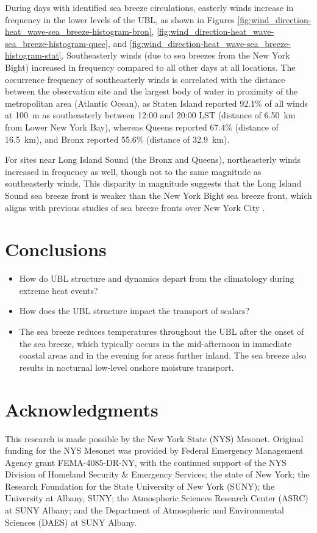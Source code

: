 \documentclass[11pt,a4paper]{article}
\begin{document}
During days with identified sea breeze circulations, easterly winds increase in frequency in the lower levels of the UBL, as shown in Figures \ref{fig:wind_direction-heat_wave-sea_breeze-histogram-bron}, \ref{fig:wind_direction-heat_wave-sea_breeze-histogram-quee}, and \ref{fig:wind_direction-heat_wave-sea_breeze-histogram-stat}. Southeasterly winds (due to sea breezes from the New York Bight) increased in frequency compared to all other days at all locations. The occurrence frequency of southeasterly winds is correlated with the distance between the observation site and the largest body of water in proximity of the metropolitan area (Atlantic Ocean), as Staten Island reported 92.1\% of all winds at \SI{100}{\meter} as southeasterly between 12:00 and 20:00 LST (distance of \SI{6.50}{\kilo\meter} from Lower New York Bay), whereas Queens reported 67.4\% (distance of \SI{16.5}{\kilo\meter}), and Bronx reported 55.6\% (distance of \SI{32.9}{\kilo\meter}). 

For sites near Long Island Sound (the Bronx and Queens), northeasterly winds increased in frequency as well, though not to the same magnitude as southeasterly winds. This disparity in magnitude suggests that the Long Island Sound sea breeze front is weaker than the New York Bight sea breeze front, which aligns with previous studies of sea breeze fronts over New York City \citep{frizzola1963, meir2013}. 

\section{Conclusions}

\begin{itemize}
	\item How do UBL structure and dynamics depart from the climatology during extreme heat events?	
	\item How does the UBL structure impact the transport of scalars?
	\item The sea breeze reduces temperatures throughout the UBL after the onset of the sea breeze, which typically occurs in the mid-afternoon in immediate coastal areas and in the evening for areas further inland. The sea breeze also results in nocturnal low-level onshore moisture transport.
\end{itemize}

\section*{Acknowledgments}
This research is made possible by the New York State (NYS) Mesonet. Original funding for the NYS Mesonet was provided by Federal Emergency Management Agency grant FEMA-4085-DR-NY, with the continued support of the NYS Division of Homeland Security \& Emergency Services; the state of New York; the Research Foundation for the State University of New York (SUNY); the University at Albany, SUNY; the Atmospheric Sciences Research Center (ASRC) at SUNY Albany; and the Department of Atmospheric and Environmental Sciences (DAES) at SUNY Albany.
\end{document}
